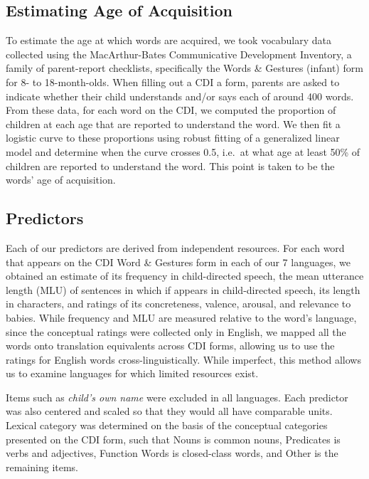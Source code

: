 \documentclass[10pt, letterpaper]{article}
\begin{document}
\subsection{Estimating Age of
Acquisition}\label{estimating-age-of-acquisition}

To estimate the age at which words are acquired, we took vocabulary data
collected using the MacArthur-Bates Communicative Development Inventory,
a family of parent-report checklists, specifically the Words \& Gestures
(infant) form for 8- to 18-month-olds. When filling out a CDI a form,
parents are asked to indicate whether their child understands and/or
says each of around 400 words. From these data, for each word on the
CDI, we computed the proportion of children at each age that are
reported to understand the word. We then fit a logistic curve to these
proportions using robust fitting of a generalized linear model and
determine when the curve crosses 0.5, i.e.~at what age at least 50\% of
children are reported to understand the word. This point is taken to be
the words' age of acquisition.

\subsection{Predictors}\label{predictors}

Each of our predictors are derived from independent resources. For each
word that appears on the CDI Word \& Gestures form in each of our 7
languages, we obtained an estimate of its frequency in child-directed
speech, the mean utterance length (MLU) of sentences in which if appears
in child-directed speech, its length in characters, and ratings of its
concreteness, valence, arousal, and relevance to babies. While frequency
and MLU are measured relative to the word's language, since the
conceptual ratings were collected only in English, we mapped all the
words onto translation equivalents across CDI forms, allowing us to use
the ratings for English words cross-linguistically. While imperfect,
this method allows us to examine languages for which limited resources
exist.

Items such as \emph{child's own name} were excluded in all languages.
Each predictor was also centered and scaled so that they would all have
comparable units. Lexical category was determined on the basis of the
conceptual categories presented on the CDI form, such that Nouns is
common nouns, Predicates is verbs and adjectives, Function Words is
closed-class words, and Other is the remaining items.
\end{document}
